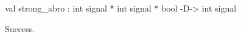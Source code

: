 \chklistingtrue
{}
\begin{ChkListingMsg}
val strong_abro : int signal * int signal * bool -D-> int signal 
\end{ChkListingMsg}
\begin{ChkListingErr}
Success.
\end{ChkListingErr}
